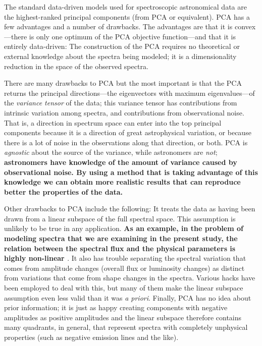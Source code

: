 \documentclass[12pt,preprint]{aastex}
\begin{document}
The standard data-driven models used for spectroscopic astronomical
data are the highest-ranked principal components (from PCA or
equivalent). PCA has a few advantages and a number of drawbacks.  The
advantages are that it is convex---there is only one optimum of the PCA
objective function---and that it is
entirely data-driven: The construction of the
PCA requires no theoretical or external knowledge about the spectra
being modeled; it is a dimensionality reduction in the space of the
observed spectra.

There are many drawbacks to PCA but the most important is that the PCA
returns the principal directions---the eigenvectors with maximum
eigenvalues---of the \emph{variance tensor} of the data; this variance
tensor has contributions from intrinsic variation among spectra, and
contributions from observational noise.  That is, a direction in
spectrum space can enter into the top principal components because it
is a direction of great astrophysical variation, or because there is a
lot of noise in the observations along that direction, or both.  PCA
is \emph{agnostic} about the source of the variance, while astronomers are
\emph{not}; \textbf{astronomers have knowledge of the amount of variance caused by 
observational noise. By using a method that is taking advantage of this 
knowledge we can obtain more realistic results that can reproduce better the properties 
of the data.}

Other drawbacks to PCA include the following: It treats the data as
having been drawn from a linear subspace of the full spectral
space. This assumption is unlikely to be true in any application. 
\textbf{As an example, in the problem of modeling spectra that we are 
examining in the present study, the relation between the spectral flux 
and the physical parameters is highly non-linear \citep{vanderplas}}.  It
also has trouble separating the spectral variation that comes from
amplitude changes (overall flux or luminosity changes) as distinct
from variations that come from shape changes in the spectra.  Various
hacks have been employed to deal with this, but many of them make the
linear subspace assumption even less valid than it was \textit{a
  priori}. Finally, PCA has no idea about prior information; it is
just as happy creating components with negative amplitudes as positive
amplitudes and the linear subspace therefore contains many quadrants,
in general, that represent spectra with completely unphysical
properties (such as negative emission lines and the like).
\end{document}
